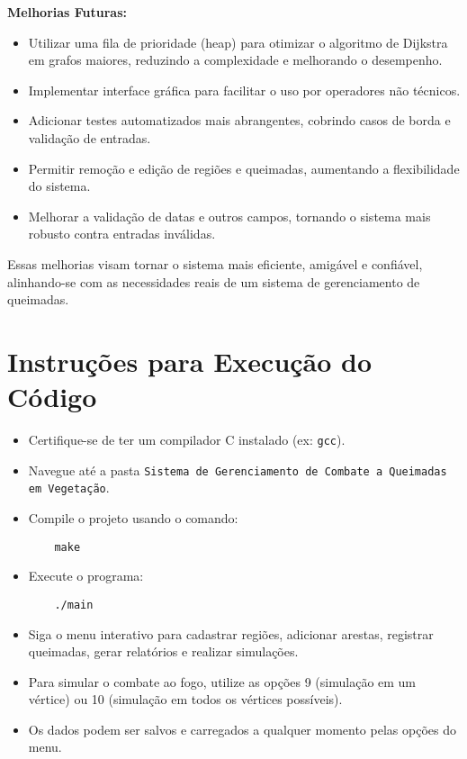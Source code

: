 \documentclass{article}
\begin{document}
\textbf{Melhorias Futuras:}
\begin{itemize}
    \item Utilizar uma fila de prioridade (heap) para otimizar o algoritmo de Dijkstra em grafos maiores, reduzindo a complexidade e melhorando o desempenho.
    \item Implementar interface gráfica para facilitar o uso por operadores não técnicos.
    \item Adicionar testes automatizados mais abrangentes, cobrindo casos de borda e validação de entradas.
    \item Permitir remoção e edição de regiões e queimadas, aumentando a flexibilidade do sistema.
    \item Melhorar a validação de datas e outros campos, tornando o sistema mais robusto contra entradas inválidas.
\end{itemize}

Essas melhorias visam tornar o sistema mais eficiente, amigável e confiável, alinhando-se com as necessidades reais de um sistema de gerenciamento de queimadas.

\section{Instruções para Execução do Código}

\begin{itemize}
    \item Certifique-se de ter um compilador C instalado (ex: \texttt{gcc}).
    \item Navegue até a pasta \texttt{Sistema de Gerenciamento de Combate a Queimadas em Vegetação}.
    \item Compile o projeto usando o comando:
    \begin{verbatim}
    make
    \end{verbatim}
    \item Execute o programa:
    \begin{verbatim}
    ./main
    \end{verbatim}
    \item Siga o menu interativo para cadastrar regiões, adicionar arestas, registrar queimadas, gerar relatórios e realizar simulações.
    \item Para simular o combate ao fogo, utilize as opções 9 (simulação em um vértice) ou 10 (simulação em todos os vértices possíveis).
    \item Os dados podem ser salvos e carregados a qualquer momento pelas opções do menu.
\end{itemize}
\end{document}
